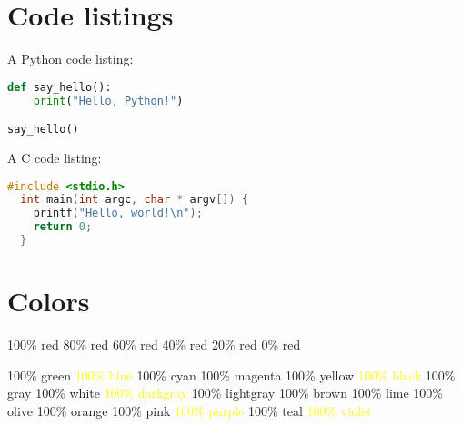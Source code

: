 \documentclass[12pt, letterpaper, oneside]{article}
\begin{document}
\section{Code listings}

A Python code listing:

\begin{lstlisting}[language=Python]
def say_hello():
    print("Hello, Python!")

say_hello()
\end{lstlisting}

A C code listing:

\begin{lstlisting}[language=C]
  #include <stdio.h>
  int main(int argc, char * argv[]) {
    printf("Hello, world!\n");
    return 0;
  }
\end{lstlisting}

\section{Colors}

\colorbox{red!100}{100\% red}
\colorbox{red!80}{80\% red}
\colorbox{red!60}{60\% red}
\colorbox{red!40}{40\% red}
\colorbox{red!20}{20\% red}
\colorbox{red!0}{0\% red}

\colorbox{green!100}{100\% green}
\colorbox{blue!100}{\textcolor{yellow}{100\% blue}}
\colorbox{cyan!100}{100\% cyan}
\colorbox{magenta!100}{100\% magenta}
\colorbox{yellow!100}{100\% yellow}
\colorbox{black!100}{\textcolor{yellow}{100\% black}}
\colorbox{gray!100}{100\% gray}
\colorbox{white!100}{100\% white}
\colorbox{darkgray!100}{\textcolor{yellow}{100\% darkgray}}
\colorbox{lightgray!100}{100\% lightgray}
\colorbox{brown!100}{100\% brown}
\colorbox{lime!100}{100\% lime}
\colorbox{olive!100}{100\% olive}
\colorbox{orange!100}{100\% orange}
\colorbox{pink!100}{100\% pink}
\colorbox{purple!100}{\textcolor{yellow}{100\% purple}}
\colorbox{teal!100}{100\% teal}
\colorbox{violet!100}{\textcolor{yellow}{100\% violet}}
\end{document}

